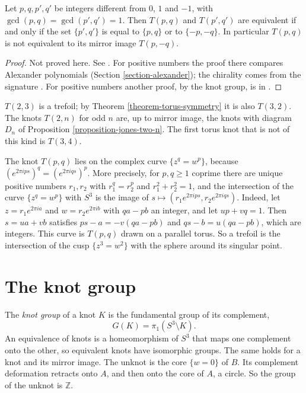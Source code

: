 \begin{theorem}
\label{theorem-torus-classification}
Let $p,q,p',q'$ be integers different
from $0$, $1$ and $-1$, with
$\gcd(p,q)=\gcd(p',q')=1$. Then
$T(p,q)$ and $T(p',q')$ are equivalent
if and only if the set $\{p',q'\}$ is
equal to $\{p,q\}$ or to $\{-p,-q\}$.
In particular $T(p,q)$ is not
equivalent to its mirror image
$T(p,-q)$.
\end{theorem}

\begin{proof}
Not proved here. See
\cite[Theorem 7.4.3]{murasugi}. For
positive numbers the proof there
compares Alexander polynomials
(Section \ref{section-alexander}); the
chirality comes from the signature
\cite[Theorem 7.4.2]{murasugi}. For
positive numbers another proof, by the
knot group, is in
\cite[Example 1.24]{hatcher}.
\end{proof}

\begin{example}
\label{example-small-torus-knots}
$T(2,3)$ is a trefoil; by
Theorem \ref{theorem-torus-symmetry} it
is also $T(3,2)$. The knots $T(2,n)$
for odd $n$ are, up to mirror image,
the knots with diagram $D_n$ of
Proposition \ref{proposition-jones-two-n}.
The first torus knot that is not of
this kind is $T(3,4)$.
\end{example}

\begin{remark}
\label{remark-torus-knot-singularity}
The knot $T(p,q)$ lies on the complex
curve $\{z^{q}=w^{p}\}$, because
$(e^{2\pi ips})^{q}
=(e^{2\pi iqs})^{p}$.
More precisely, for $p,q\geq 1$ coprime
there are unique positive numbers
$r_1,r_2$ with $r_1^{q}=r_2^{p}$ and
$r_1^{2}+r_2^{2}=1$, and the
intersection of the curve
$\{z^{q}=w^{p}\}$ with $S^3$ is the
image of
$s\mapsto(r_1e^{2\pi ips},
r_2e^{2\pi iqs})$. Indeed, let
$z=r_1e^{2\pi ia}$ and
$w=r_2e^{2\pi ib}$ with $qa-pb$ an
integer, and let $up+vq=1$. Then
$s=ua+vb$ satisfies
$ps-a=-v(qa-pb)$ and
$qs-b=u(qa-pb)$, which are integers.
This curve is $T(p,q)$ drawn on a
parallel torus. So a trefoil is the
intersection of the cusp
$\{z^{3}=w^{2}\}$ with the sphere
around its singular point.
\end{remark}

\section{The knot group}
\label{section-knot-group}

\noindent
The {\it knot group} of a knot $K$ is
the fundamental group of its
complement,
$$
G(K)=\pi_1(S^3\setminus K).
$$
An equivalence of knots is a
homeomorphism of $S^3$ that maps one
complement onto the other, so
equivalent knots have isomorphic
groups. The same holds for a knot and
its mirror image. The unknot is the
core $\{w=0\}$ of $B$. Its complement
deformation retracts onto $A$, and then
onto the core of $A$, a circle. So the
group of the unknot is $\mathbb{Z}$.

